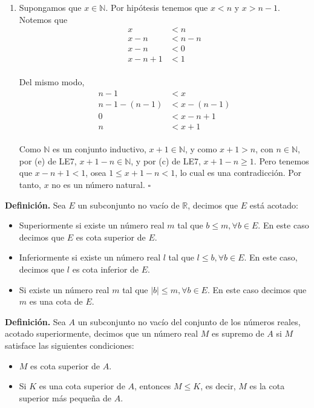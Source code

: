 \documentclass[11pt]{article}
\newcommand{\N}{\mathbb{N}}
\newcommand{\R}{\mathbb{R}}
\begin{document}
\begin{enumerate}[label=\alph*)]
    \item Supongamos que $x\in \N$. Por hipótesis tenemos que $x<n$ y $x>n-1$. Notemos que \begin{align*}
        x &< n\\
        x -n &< n-n\\
        x-n &< 0\\
        x-n +1 &< 1
    \end{align*}\\
    Del mismo modo, \begin{align*}
        n-1 &< x\\
        n-1-(n-1) &< x - (n-1)\\
        0 &< x-n+1\\
        n &< x+1
    \end{align*}\\
    Como $\N$ es un conjunto inductivo, $x+1\in \N$, y como $x+1>n$, con $n\in \N$, por (e) de LE7, $x+1-n \in \N$, y por (c) de LE7, $x+1-n\geq 1$. Pero tenemos que $x-n+1<1$, osea $1\leq x+1-n<1$, lo cual es una contradicción. Por tanto, $x$ no es un número natural. \mbox{}\hfill $\square$
\end{enumerate}

\pagebreak

\textbf{Definición.} Sea $E$ un subconjunto no vacío de $\R$, decimos que $E$ está acotado: \begin{itemize}
    \item Superiormente si existe un número real $m$ tal que $b \leq m, \forall b\in E$. En este caso decimos que $E$ es cota superior de $E$.
    \item Inferiormente si existe un número real $l$ tal que $l \leq b, \forall b\in E$. En este caso, decimos que $l$ es cota inferior de $E$.
    \item Si existe un número real $m$ tal que $|b|\leq m,\forall b \in E$. En este caso decimos que $m$ es una cota de $E$.
\end{itemize}

\textbf{Definición.} Sea $A$ un subconjunto no vacío del conjunto de los números reales, acotado superiormente, decimos que un número real $M$ es supremo de $A$ si $M$ satisface las siguientes condiciones: \begin{itemize}
    \item $M$ es cota superior de $A$.
    \item Si $K$ es una cota superior de $A$, entonces $M\leq K$, es decir, $M$ es la cota superior más pequeña de $A$.
\end{itemize}
\end{document}
